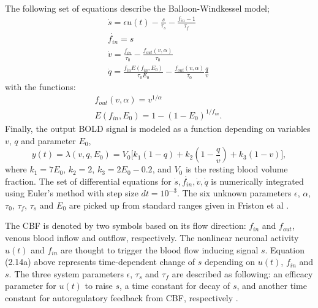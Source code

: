 The following set of equations describe the Balloon-Windkessel model;
\begin{subequations}
 \begin{align} \dot{s} = \epsilon u(t)- \frac{s}{\tau_s} - \frac{f_{in} -1 }{\tau_f}  \label{eqn: frobenius 19}\\  \dot{f_{in}} = s
\label{eqn: frobenius 20} \\ \dot{v} = \frac{f_{in}}{\tau_0} - \frac{f_{out}(v, \alpha)}{\tau_0} 
\label{eqn: frobenius 21} \\ \dot{q} = \frac{f_{in} E(f_{in}, E_0)}{\tau_0 E_0}- \frac{f_{out}(v, \alpha)}{\tau_0}  \frac{q}{v}  
\
\end{align} 
\end{subequations}
with the functions:
\begin{subequations}
 \begin{align} f_{out}(v, \alpha) = v^{1/ \alpha}
 \label{eqn: frobenius 22}\\  E(f_{in} , E_0) = 1- (1-E_0)^{1/f_{in}} . \
\end{align} 
\end{subequations}
Finally, the output BOLD signal is modeled as a function depending on variables $v$, $q$ and parameter $E_0$,  
\begin{equation}
y(t)= \lambda (v,q,E_0) = V_0 \Big[ k_1(1-q) + k_2 \left( 1- \frac{q}{v} \right) + k_3(1-v)  \Big],
\end{equation} 
where $k_1 = 7E_0$, $k_2 = 2$, $k_3 = 2E_0 - 0.2$, and $V_0$ is the resting blood volume fraction. The set of differential equations for ${\dot{s}, \dot{f_{in}}, \dot{v}, \dot{q}}$ is numerically integrated using Euler's method with step size $dt=10^{-3}$. The six unknown parameters $\epsilon$, $\alpha$, $\tau_0$, $\tau_f$, $\tau_s$ and $E_0$ are picked up from standard ranges given in Friston et al  \citep{FRI00}. 

The CBF is denoted by two symbols based on its flow direction: $f_{in}$ and $f_{out}$, venous blood inflow and outflow, respectively. The nonlinear neuronal activity $u(t)$ and $f_{in}$ are thought to trigger the blood flow inducing signal $s$. Equation (2.14a) above represents time-dependent change of  $s$ depending on $u(t)$, $f_{in}$ and $s$. The three system parameters $\epsilon$, $\tau_s$ and $\tau_f$ are described as following: an efficacy parameter for $u(t)$ to raise $s$, a time constant for decay of $s$, and another time constant for autoregulatory feedback from CBF, respectively \citep{XYZ1994, XYZ1998}.

